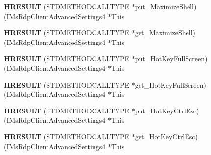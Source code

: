 \begin{DoxyCompactItemize}
\item 
\mbox{\label{struct_i_ms_rdp_client_advanced_settings4_vtbl_a3d77e099d41ecb3942cc3b1bd7a618e9}} 
{\bfseries H\+R\+E\+S\+U\+LT} (S\+T\+D\+M\+E\+T\+H\+O\+D\+C\+A\+L\+L\+T\+Y\+PE $\ast$put\+\_\+\+Maximize\+Shell)(I\+Ms\+Rdp\+Client\+Advanced\+Settings4 $\ast$This
\item 
\mbox{\label{struct_i_ms_rdp_client_advanced_settings4_vtbl_ad238dcfa3e3c2f073e8c587d4dc0f1ee}} 
{\bfseries H\+R\+E\+S\+U\+LT} (S\+T\+D\+M\+E\+T\+H\+O\+D\+C\+A\+L\+L\+T\+Y\+PE $\ast$get\+\_\+\+Maximize\+Shell)(I\+Ms\+Rdp\+Client\+Advanced\+Settings4 $\ast$This
\item 
\mbox{\label{struct_i_ms_rdp_client_advanced_settings4_vtbl_a7042c582f47cd84fef46646466cf0927}} 
{\bfseries H\+R\+E\+S\+U\+LT} (S\+T\+D\+M\+E\+T\+H\+O\+D\+C\+A\+L\+L\+T\+Y\+PE $\ast$put\+\_\+\+Hot\+Key\+Full\+Screen)(I\+Ms\+Rdp\+Client\+Advanced\+Settings4 $\ast$This
\item 
\mbox{\label{struct_i_ms_rdp_client_advanced_settings4_vtbl_ab828bf0eac590537c3b0c709a866e45a}} 
{\bfseries H\+R\+E\+S\+U\+LT} (S\+T\+D\+M\+E\+T\+H\+O\+D\+C\+A\+L\+L\+T\+Y\+PE $\ast$get\+\_\+\+Hot\+Key\+Full\+Screen)(I\+Ms\+Rdp\+Client\+Advanced\+Settings4 $\ast$This
\item 
\mbox{\label{struct_i_ms_rdp_client_advanced_settings4_vtbl_ad2db7cfdcb40ba3de53818c67d387c10}} 
{\bfseries H\+R\+E\+S\+U\+LT} (S\+T\+D\+M\+E\+T\+H\+O\+D\+C\+A\+L\+L\+T\+Y\+PE $\ast$put\+\_\+\+Hot\+Key\+Ctrl\+Esc)(I\+Ms\+Rdp\+Client\+Advanced\+Settings4 $\ast$This
\item 
\mbox{\label{struct_i_ms_rdp_client_advanced_settings4_vtbl_a8eb6bf4cc5183e4e673c97b05b035633}} 
{\bfseries H\+R\+E\+S\+U\+LT} (S\+T\+D\+M\+E\+T\+H\+O\+D\+C\+A\+L\+L\+T\+Y\+PE $\ast$get\+\_\+\+Hot\+Key\+Ctrl\+Esc)(I\+Ms\+Rdp\+Client\+Advanced\+Settings4 $\ast$This
\item 
\mbox{\label{struct_i_ms_rdp_client_advanced_settings4_vtbl_a3e6b94f459df36573e6b63bb4a8a4b6f}} 

\end{DoxyCompactItemize}
